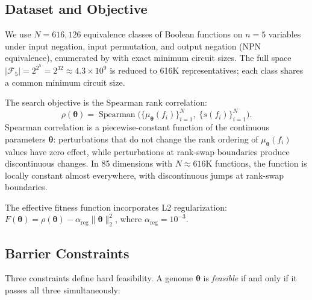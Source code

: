 \documentclass[twoside,11pt]{article}
\newcommand{\btheta}{\boldsymbol{\theta}}
\newcommand{\calF}{\mathcal{F}}
\begin{document}
\subsection{Dataset and Objective}

We use $N = 616{,}126$ equivalence classes of Boolean functions on $n=5$
variables under input negation, input permutation, and output negation
(NPN equivalence),
enumerated by \citet{knuth2011art} with exact minimum circuit sizes.
The full space $|\calF_5| = 2^{2^5} = 2^{32} \approx 4.3 \times 10^9$ is
reduced to 616K representatives; each class shares a common minimum circuit size.

The search objective is the Spearman rank correlation:
\begin{equation}
\label{eq:objective}
\rho(\btheta) = \operatorname{Spearman}\bigl(\{\mu_\btheta(f_i)\}_{i=1}^N,\;
  \{s(f_i)\}_{i=1}^N\bigr).
\end{equation}
Spearman correlation is a piecewise-constant function of the continuous
parameters $\btheta$: perturbations that do not change the rank ordering of
$\mu_\btheta(f_i)$ values have zero effect, while perturbations at rank-swap
boundaries produce discontinuous changes. In 85 dimensions with $N \approx 616$K
functions, the function is locally constant almost everywhere, with
discontinuous jumps at rank-swap boundaries.

The effective fitness function incorporates L2 regularization:
$F(\btheta) = \rho(\btheta) - \alpha_{\text{reg}} \|\btheta\|_2^2$, where
$\alpha_{\text{reg}} = 10^{-3}$.

\subsection{Barrier Constraints}

Three constraints define hard feasibility. A genome $\btheta$ is \emph{feasible}
if and only if it passes all three simultaneously:
\end{document}
